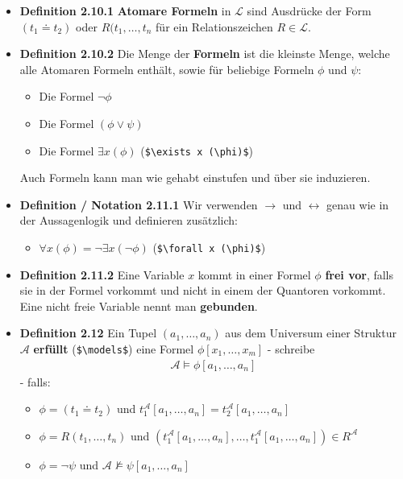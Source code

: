 \documentclass{scrartcl}
\renewcommand{\models}[0]{\vDash}
\begin{document}
\begin{itemize}
    \item \textbf{Definition 2.10.1} \textbf{Atomare Formeln} in $\mathcal{L}$ sind Ausdrücke der Form $(t_1 \doteq t_2)$ oder $R(t_1, \hdots, t_n$ für ein Relationszeichen $R \in \mathcal{L}$.
    \item \textbf{Definition 2.10.2} Die Menge der \textbf{Formeln} ist die kleinste Menge, welche alle Atomaren Formeln enthält, sowie für beliebige Formeln $\phi$ und $\psi$:
    \begin{itemize}
        \item Die Formel $\neg \phi$
        \item Die Formel $(\phi \vee \psi)$
        \item Die Formel $\exists x (\phi)$ (\texttt{\$\textbackslash exists x (\textbackslash phi)\$})
    \end{itemize}
    Auch Formeln kann man wie gehabt einstufen und über sie induzieren.
    \item \textbf{Definition / Notation 2.11.1} Wir verwenden $\to$ und $\leftrightarrow$ genau wie in der Aussagenlogik und definieren zusätzlich:
    \begin{itemize}
        \item $\forall x (\phi) = \neg \exists x (\neg \phi)$ (\texttt{\$\textbackslash forall x (\textbackslash phi)\$})
    \end{itemize}
    \item \textbf{Definition  2.11.2} Eine Variable $x$ kommt in einer Formel $\phi$ \textbf{frei vor}, falls sie in der Formel vorkommt und nicht in einem der Quantoren vorkommt. Eine nicht freie Variable nennt man \textbf{gebunden}.
    \item \textbf{Definition 2.12} Ein Tupel $(a_1, \hdots, a_n)$ aus dem Universum einer Struktur $\mathcal{A}$ \textbf{erfüllt} (\texttt{\$\textbackslash models\$}) eine Formel $\phi[x_1,\dots, x_m]$ - schreibe 
    \begin{align*}
        \mathcal{A} \models \phi[a_1,\hdots,a_n]
    \end{align*}
    - falls:
    \begin{itemize}
        \item $\phi = (t_1 \doteq t_2)$ und $t_1^\mathcal{A}[a_1, \hdots, a_n] = t_2^\mathcal{A}[a_1,\hdots, a_n]$
        \item $\phi = R(t_1, \hdots, t_n)$ und $(t_1^\mathcal{A}[a_1, \hdots, a_n], \hdots, t_1^\mathcal{A}[a_1, \hdots, a_n]) \in R^\mathcal{A}$
        \item $\phi = \neg \psi$ und $\mathcal{A} \nvDash \psi[a_1, \hdots, a_n]$

\end{itemize}
\end{itemize}
\end{document}
